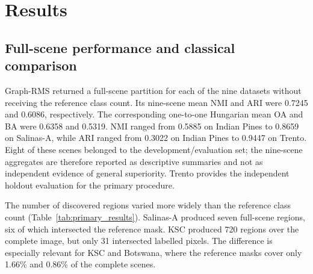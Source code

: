 \documentclass[10pt,a4paper,fleqn]{article}
\begin{document}
\FloatBarrier
\section{Results}
\label{sec:results}

\subsection{Full-scene performance and classical comparison}
\label{subsec:overall_results}

Graph-RMS returned a full-scene partition for each of the nine datasets without
receiving the reference class count. Its nine-scene mean NMI and ARI were
0.7245 and 0.6086, respectively. The corresponding one-to-one Hungarian mean
OA and BA were 0.6358 and 0.5319. NMI ranged from 0.5885 on Indian Pines to
0.8659 on Salinas-A, while ARI ranged from 0.3022 on Indian Pines to 0.9447
on Trento. Eight of these scenes belonged to the development/evaluation set;
the nine-scene aggregates are therefore reported as descriptive summaries and
not as independent evidence of general superiority. Trento provides the
independent holdout evaluation for the primary procedure.

The number of discovered regions varied more widely than the reference class
count (Table~\ref{tab:primary_results}). Salinas-A produced seven full-scene
regions, six of which intersected the reference mask. KSC produced 720 regions
over the complete image, but only 31 intersected labelled pixels. The
difference is especially relevant for KSC and Botswana, where the reference
masks cover only 1.66\% and 0.86\% of the complete scenes.
\end{document}
